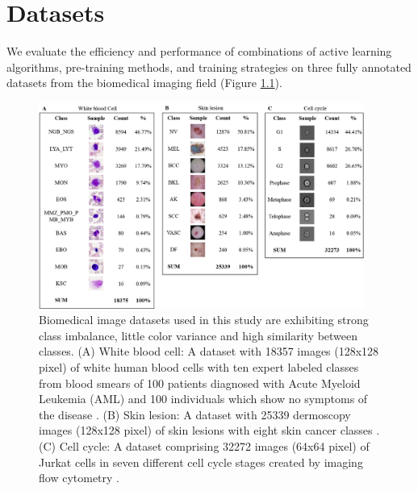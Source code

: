 
\chapter{Datasets}\label{chapter:datasets}
We evaluate the efficiency and performance of combinations of active learning algorithms, pre-training methods, and training strategies on three fully annotated datasets from the biomedical imaging field (Figure \ref{fig:datasets_composition}).

\begin{figure}[htbp]
\centering
\captionsetup{format=plain}
\includegraphics[width=0.95\textwidth]{figures/fig_datasets_composition.png}
\caption{Biomedical image datasets used in this study are exhibiting strong class imbalance, little color variance and high similarity between classes. (A) White blood cell: A dataset with 18357 images (128x128 pixel) of white human blood cells with ten expert labeled classes from blood smears of 100 patients diagnosed with Acute Myeloid Leukemia (AML) and 100 individuals which show no symptoms of the disease \cite{matek2019, clark2013}. (B) Skin lesion: A dataset with 25339 dermoscopy images (128x128 pixel) of skin lesions with eight skin cancer classes \cite{codella2018, combalia2019, tschandl2018}. (C) Cell cycle: A dataset comprising 32272 images (64x64 pixel) of Jurkat cells in seven different cell cycle stages created by imaging flow cytometry \cite{eulenberg2017}.}
\label{fig:datasets_composition}
\end{figure}

\newpage

